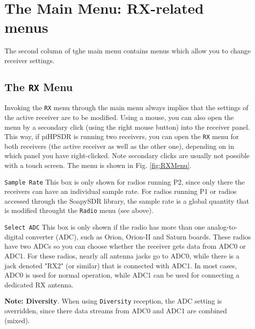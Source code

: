 \documentclass[12pt]{book}
\def\rett#1{\texttt{\color{red}#1}}
\def\bltt#1{\texttt{\color{blue}#1}}
\begin{document}
\chapter{The Main Menu: RX-related menus}

The second column of tghe main menu contains menus which allow you to change
receiver settings.

\section{The \texttt{RX} Menu}

Invoking the \bltt{RX} menu through the main menu always implies that the settings
of the active receiver are to be modified. Using a mouse, you can also open the menu
by a secondary click (using the right mouse button) into the receiver panel. This way,
if piHPSDR is running two receivers, you can open the \bltt{RX} menu for both receivers
(the active receiver as well as the other one), depending on in which panel you have
right-clicked. Note secondary clicks are usually not possible with a touch screen.
The menu is shown in Fig. \ref{fig:RXMenu}.

\rett{Sample Rate} This box is only shown for radios running P2, since only there the
receivers can have an individual sample rate. For radios running P1 or radios accessed
through the SoapySDR library, the sample rate is a global quantity that is modified
throught the \bltt{Radio} menu (see above).

\rett{Select ADC} This box is only shown if the radio has more than one analog-to-digital
converter (ADC), such as Orion, Orion-II and Saturn boards. These radios have two ADCs so
you can choose whether the receiver gets data from ADC0 or ADC1. For these radios, nearly
all antenna jacks go to ADC0, while there is a jack denoted "RX2" (or similar) that
is connected with ADC1. In most cases, ADC0 is used for normal operation, while ADC1
can be used for connecting a dedicated RX antenna.

\textbf{Note: Diversity}. When using \bltt{Diversity} reception, the ADC setting is
overridden, since there data streams from ADC0 and ADC1 are combined (mixed).
\end{document}
